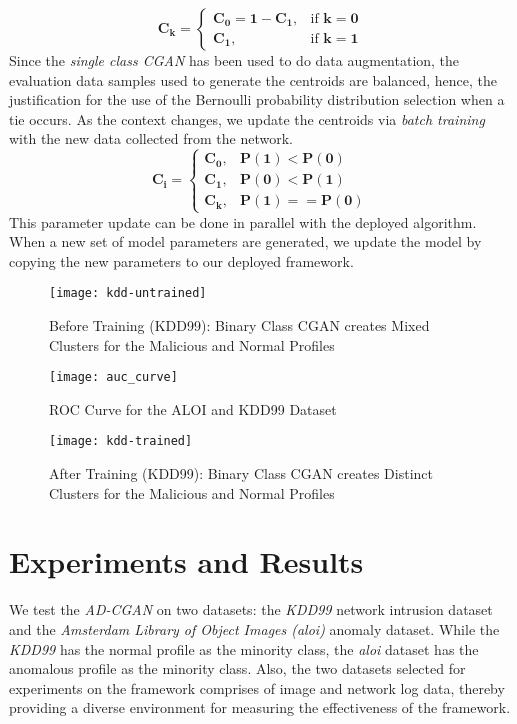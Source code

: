 \begin{equation}
\label{eq:bernoulli}
\bm{C_k} = \left\{
\begin{array}{lr}
\bm{C_0 = 1-C_1}, & \text{if } \bm{k=0} \\
\bm{C_1}, & \text{if }  \bm{k=1}
\end{array}
\right.
\end{equation}
Since the \textit{single class CGAN} has been used to do data augmentation, the evaluation data samples used to generate the centroids are balanced, hence, the justification for the use of the Bernoulli probability distribution selection when a tie occurs. As the context changes, we update the centroids via \textit{batch training} with the new data collected from the network. 
\begin{equation}
\label{eq:decision}
\bm{C_i} = \left\{ 
\begin{array}{lr}	
\bm{C_0}, & \bm{P(1) < P(0)} \\
\bm{C_1}, & \bm{P(0) < P(1)} \\
\bm{C_k}, & \bm{P(1) == P(0)}
\end{array}
\right.  
\end{equation}
This parameter update can be done in parallel with the deployed algorithm. When a new set of model parameters are generated, we update the model by copying the new parameters to our deployed framework.
\begin{figure*}
	\centering
	\texttt{[image: kdd-untrained]}
	\caption{Before Training (KDD99): Binary Class CGAN creates Mixed Clusters for the Malicious and Normal Profiles}
	\label{fig:kdd-untrained}
\end{figure*}
 \begin{figure}[h!]
	\centering
	\texttt{[image: auc\_curve]}%
	\caption{ROC Curve for the ALOI and KDD99 Dataset}
	\label{fig:auc-curve-aloi}%
\end{figure}
\begin{figure*}
	\centering
	\texttt{[image: kdd-trained]}
	\caption{After Training (KDD99): Binary Class CGAN creates Distinct Clusters for the Malicious and Normal Profiles }
	\label{fig:kdd-trained}
\end{figure*}
\section{Experiments and Results}
\label{sec:experiments}
We test the \textit{AD-CGAN} on two datasets: the \textit{KDD99} network intrusion dataset and the \textit{Amsterdam Library of Object Images (aloi)} \cite{goldstein2016comparative} anomaly dataset. While the \textit{KDD99} has the normal profile as the minority class, the \textit{aloi} dataset has the anomalous profile as the minority class. Also, the two datasets selected for experiments on the framework comprises of image and network log data, thereby providing a diverse environment for measuring the effectiveness of the framework.

